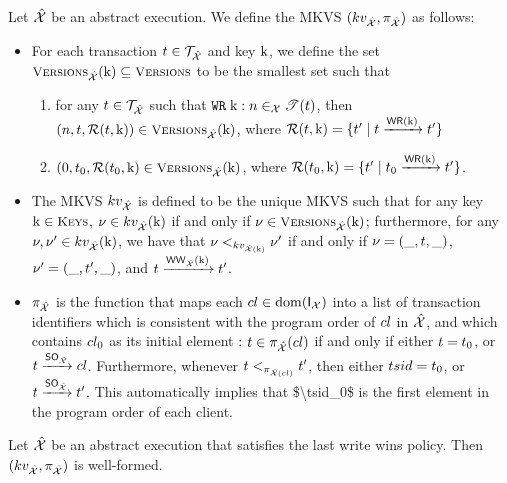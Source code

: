 \begin{definition}
Let $\hat{\mathcal{X}}$ be an abstract execution. 
We define the MKVS $(kv_{\hat{\mathcal{X}}}, \pi_{\hat{\mathcal{X}}})$ as follows: 
\begin{itemize}
\item For each transaction $t \in \mathcal{T}_{\hat{\mathcal{X}}}$ and key $\mathrm{k}$, 
we define the set $\Versions_{\hat{\aexec}}(\key{k}) \subseteq \Versions$ to be the smallest set such that 
\begin{enumerate}
\item for any $t \in \mathcal{T}_{\hat{\mathcal{X}}}$ such that ${{\tt WR}}\;\mathrm{k}: n \in_{\mathcal{X}} \mathscr{T}(t)$,
then
$(n, \tsid, \mathcal{R}(\tsid, \key{k})) \in \Versions_{\hat{\aexec}}(\key{k})$, 
where $\mathcal{R}(t, \mathrm{k}) = \{t' \mid t \xrightarrow{{\mathsf{WR}}(\mathrm{k})} t'\}$ 
\item $(0, \tsid_0, \mathcal{R}(\tsid_{0}, \key{k}) \in \Versions_{\hat{\aexec}}(\key{k})$, 
where $\mathcal{R}(t_{0}, \mathrm{k}) = \{t' \mid t_0 \xrightarrow{{\mathsf{WR}}(\mathrm{k})} t'\}$.
\end{enumerate}
\item The MKVS $kv_{\hat{\mathcal{X}}}$ is defined to be the unique MKVS such that 
for any key $\key{k} \in \Addr$, $\nu \in kv_{\hat{\mathcal{X}}}(\mathrm{k})$ if and only if 
$\nu \in \Versions_{\hat{\aexec}}(\key{k})$; furthermore, for any $\nu, \nu' \in kv_{\hat{\mathcal{X}}}(\mathrm{k})$, 
we have that $\nu <_{kv_{\hat{\mathcal{X}}(\mathrm{k})}} \nu'$ if and only if $\nu = (\_, t, \_)$, 
$\nu' = (\_, t', \_)$, and $t \xrightarrow{{\mathsf{WW}}_{\hat{\mathcal{X}}}(\mathrm{k})} t'$.
\item $\pi_{\hat{\mathcal{X}}}$ is the function that maps each $cl \in \operatorname{dom}(\mathsf{I}_{\mathcal{X}})$ into a list of transaction 
identifiers which is consistent with the program order of $cl$ in $\hat{\mathcal{X}}$, and which 
contains $cl_0$ as its initial element : $t \in \pi_{\hat{\mathcal{X}}}(cl)$ 
if and only if either $t = t_0$, or $t \xrightarrow{{\sf{SO}}_{\hat{\mathcal{X}}}} cl$. 
Furthermore, whenever $t <_{\pi_{\hat{\mathcal{X}}(cl)}} t'$, then either 
$tsid = t_0$, or $t \xrightarrow{{\sf{SO}}_{\hat{\mathcal{X}}}} t'$. 
\ac{This automatically implies that $\tsid_0$ is the first element in the program order 
of each client.}
\end{itemize}
\end{definition}

\begin{proposition}
Let $\hat{\mathcal{X}}$ be an abstract execution that satisfies the last write wins policy. 
Then $(kv_{\hat{\mathcal{X}}}, \pi_{\hat{\mathcal{X}}})$ is well-formed.
\end{proposition}


